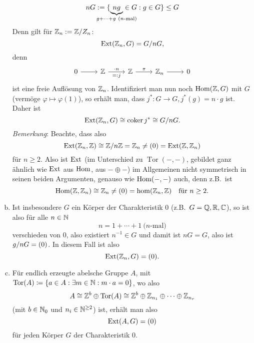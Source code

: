 \begin{beispiel}
\begin{enumerate}[(a)]
      \begin{equation*}
        n G := \{ \underset{\mathclap{g+\dotsb+g \ (\text{$n$-mal})}}{\underbrace{ng}} \in G : g \in G \} \leq G
      \end{equation*}
      Denn gilt für $\mathbb{Z}_n := \mathbb{Z} / {Z_n}$:
      \begin{equation*}
        \mathrm{Ext}(\mathbb{Z}_n, G) = G/{nG},
      \end{equation*}
      denn
      \begin{equation*}
        \begin{tikzcd}
          0 \arrow{r}{} & \Z \arrow{r}{\cdot n}[swap]{=:j}  & \Z \arrow{r}{\pi} & \Z_n \arrow{r}{}  & 0
        \end{tikzcd}
      \end{equation*}
      ist eine freie Auflösung von $\mathbb{Z}_n$.
      Identifiziert man nun noch $\mathrm{Hom}(\mathbb{Z},G)$ mit $G$ (vermöge $\varphi \mapsto \varphi(1)$), so erhält man, dass $j^*\colon G \to G, j^*(g) = n \cdot g$ ist.
      Daher ist
      \begin{equation*}
        \mathrm{Ext}(\mathbb{Z}_n,G) \cong \operatorname{coker} j^* \cong G/{nG}.
      \end{equation*}
      \emph{Bemerkung}: Beachte, dass also
      \begin{equation*}
        \mathrm{Ext}(\mathbb{Z}_n,\mathbb{Z}) \cong \mathbb{Z}/{n\mathbb{Z}} = \mathbb{Z}_n \neq (0) = \mathrm{Ext}(\mathbb{Z},\mathbb{Z}_n)
      \end{equation*}
      für $n \ge 2$.
      Also ist $\mathrm{Ext}$ (im Unterschied zu $\operatorname{Tor}(-,-)$, gebildet ganz ähnlich wie $\mathrm{Ext}$ aus $\mathrm{Hom}$, aus $-\oplus-$) im Allgemeinen nicht symmetrisch in seinen beiden Argumenten, genauso wie $\mathrm{Hom}(-,-)$ auch, denn z.B.\ ist
      \begin{equation*}
        \mathrm{Hom}(\mathbb{Z},\mathbb{Z}_n) \cong \mathbb{Z}_n \neq (0) = \hom(\mathbb{Z}_n,\mathbb{Z}) \quad \text{für $n\geq 2$}.
      \end{equation*}
    \item
      Ist insbesondere $G$ ein Körper der Charakteristik 0 (z.B.\ $G = \mathbb{Q},\mathbb{R},\mathbb{C}$), so ist also für alle $n \in \mathbb{N}$
      \begin{equation*}
        n = 1 + \dotsb + 1 \ \text{($n$-mal)}
      \end{equation*}
      verschieden von $0$, also existiert $n^{-1} \in G$ und damit ist $nG = G$, also ist $g/{nG} = (0)$.
      In diesem Fall ist also
      \begin{equation*}
        \mathrm{Ext}(\mathbb{Z}_n,G) = (0).
      \end{equation*}
    \item
      Für endlich erzeugte abelsche Gruppe $A$, mit $\mathrm{Tor}(A) \coloneqq \left\{ a \in A : \exists m \in \mathbb{N} : m \cdot a = 0 \right\}$, wo also
      \begin{equation*}
        A \cong \mathbb{Z}^b \oplus \mathrm{Tor}(A) \cong \mathbb{Z}^b \oplus \mathbb{Z}_{n_1} \oplus \dotsb \oplus \mathbb{Z}_{n_r}
      \end{equation*}
      (mit $b \in \mathbb{N}_0$ und $n_i \in \mathbb{N}^{\ge 2}$) ist, erhält man also
    \begin{equation*}
      \mathrm{Ext}(A,G) = (0)
    \end{equation*}
    für jeden Körper $G$ der Charakteristik 0.
  \end{enumerate}
\end{beispiel}
